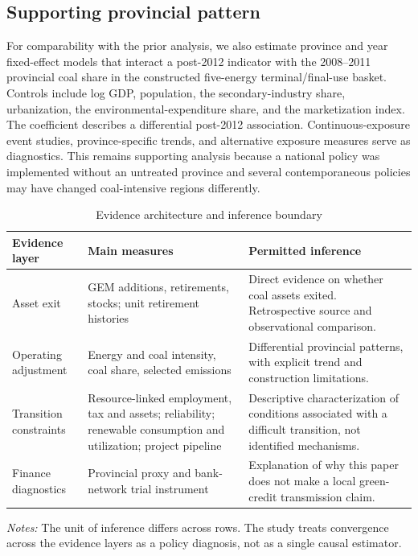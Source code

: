 \documentclass[11pt]{article}
\newcommand{\note}[1]{\begin{minipage}{0.96\textwidth}\footnotesize\textit{Notes:} #1\end{minipage}}
\begin{document}
\subsection{Supporting provincial pattern}

For comparability with the prior analysis, we also estimate province and year fixed-effect models that interact a post-2012 indicator with the 2008--2011 provincial coal share in the constructed five-energy terminal/final-use basket. Controls include log GDP, population, the secondary-industry share, urbanization, the environmental-expenditure share, and the marketization index. The coefficient describes a differential post-2012 association. Continuous-exposure event studies, province-specific trends, and alternative exposure measures serve as diagnostics. This remains supporting analysis because a national policy was implemented without an untreated province and several contemporaneous policies may have changed coal-intensive regions differently.

\begin{table}[H]
\centering
\small
\caption{Evidence architecture and inference boundary}
\label{tab:architecture}
\begin{tabularx}{\textwidth}{p{3.5cm}p{3.5cm}X}
\toprule
Evidence layer & Main measures & Permitted inference \\
\midrule
Asset exit & GEM additions, retirements, stocks; unit retirement histories & Direct evidence on whether coal assets exited. Retrospective source and observational comparison. \\
Operating adjustment & Energy and coal intensity, coal share, selected emissions & Differential provincial patterns, with explicit trend and construction limitations. \\
Transition constraints & Resource-linked employment, tax and assets; reliability; renewable consumption and utilization; project pipeline & Descriptive characterization of conditions associated with a difficult transition, not identified mechanisms. \\
Finance diagnostics & Provincial proxy and bank-network trial instrument & Explanation of why this paper does not make a local green-credit transmission claim. \\
\bottomrule
\end{tabularx}
\note{The unit of inference differs across rows. The study treats convergence across the evidence layers as a policy diagnosis, not as a single causal estimator.}
\end{table}
\end{document}
